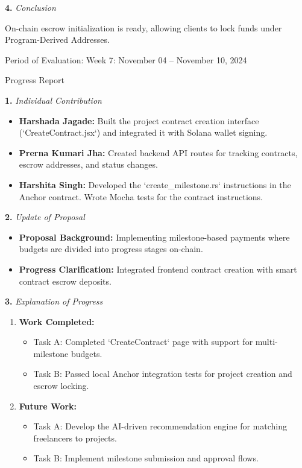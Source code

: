 \documentclass[12pt]{article}
\newcommand{\phasetitle}[1]{{\large Period of Evaluation: #1}\par\vspace{4pt}}
\newcommand{\progressreport}{{\large Progress Report}\par\vspace{4pt}}
\newcommand{\subhead}[2]{\textbf{#1.} \textit{#2}\par}
\begin{document}
\subhead{4}{Conclusion}
On-chain escrow initialization is ready, allowing clients to lock funds under Program-Derived Addresses.

\newpage

\phasetitle{Week 7: November 04 -- November 10, 2024}

\progressreport

\subhead{1}{Individual Contribution}
\begin{itemize}[leftmargin=2em]
    \item \textbf{Harshada Jagade:} Built the project contract creation interface (`CreateContract.jsx`) and integrated it with Solana wallet signing.
    \item \textbf{Prerna Kumari Jha:} Created backend API routes for tracking contracts, escrow addresses, and status changes.
    \item \textbf{Harshita Singh:} Developed the `create\_milestone.rs` instructions in the Anchor contract. Wrote Mocha tests for the contract instructions.
\end{itemize}

\subhead{2}{Update of Proposal}
\begin{itemize}[leftmargin=2em]
    \item \textbf{Proposal Background:} Implementing milestone-based payments where budgets are divided into progress stages on-chain.
    \item \textbf{Progress Clarification:} Integrated frontend contract creation with smart contract escrow deposits.
\end{itemize}

\newpage

\subhead{3}{Explanation of Progress}
\begin{enumerate}[leftmargin=2em]
    \item \textbf{Work Completed:}
    \begin{itemize}[leftmargin=2em]
        \item Task A: Completed `CreateContract` page with support for multi-milestone budgets.
        \item Task B: Passed local Anchor integration tests for project creation and escrow locking.
    \end{itemize}
    \item \textbf{Future Work:}
    \begin{itemize}[leftmargin=2em]
        \item Task A: Develop the AI-driven recommendation engine for matching freelancers to projects.
        \item Task B: Implement milestone submission and approval flows.
    \end{itemize}
\end{enumerate}
\end{document}
